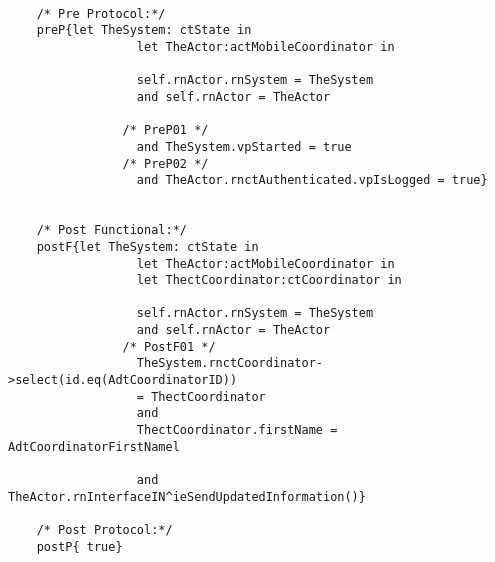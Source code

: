 	\scriptsize
	\vspace{0.5cm}
	\begin{lstlisting}[style=MessirStyle,firstnumber=auto,captionpos=b,caption={\msrmessir (MCL-oriented) specification of the operation \emph{oeSaveUpdates}.},label=OM-actMobileCoordinator-oeSaveUpdates-MCL-LST]

	/* Pre Protocol:*/ 
	preP{let TheSystem: ctState in
				  let TheActor:actMobileCoordinator in
				  
				  self.rnActor.rnSystem = TheSystem
				  and self.rnActor = TheActor
				  
				/* PreP01 */
				  and TheSystem.vpStarted = true
				/* PreP02 */
				  and TheActor.rnctAuthenticated.vpIsLogged = true}
	
	
	/* Post Functional:*/ 
	postF{let TheSystem: ctState in
				  let TheActor:actMobileCoordinator in
				  let ThectCoordinator:ctCoordinator in
				  
				  self.rnActor.rnSystem = TheSystem
				  and self.rnActor = TheActor
				/* PostF01 */
				  TheSystem.rnctCoordinator->select(id.eq(AdtCoordinatorID))
	  			  = ThectCoordinator
	  			  and
	  			  ThectCoordinator.firstName = AdtCoordinatorFirstNamel
	  			   
				  and TheActor.rnInterfaceIN^ieSendUpdatedInformation()}
	
	/* Post Protocol:*/ 
	postP{ true}
	
	\end{lstlisting}
	\normalsize 
	
	
	
	





